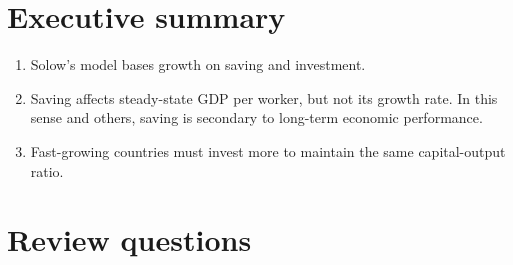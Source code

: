 



\section*{Executive summary}

\begin{enumerate}
\item Solow's model bases growth on saving and investment.

\item Saving affects steady-state GDP per worker,
but not its growth rate.
In this sense and others, saving is secondary to long-term
economic performance.

\item
Fast-growing countries must invest more to maintain the same
capital-output ratio.
\end{enumerate}

\section*{Review questions}

